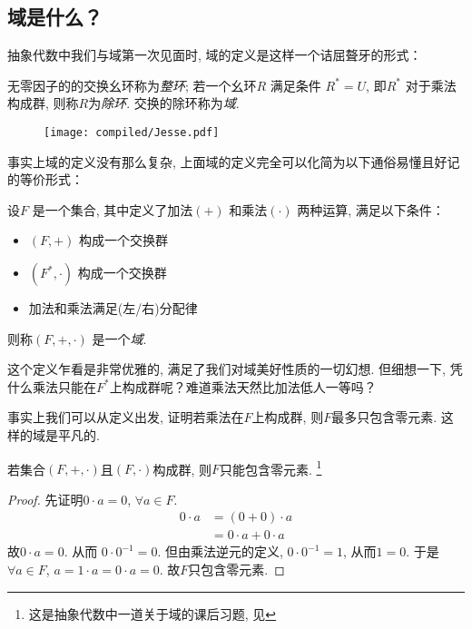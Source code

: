 \subsection{域是什么？}

抽象代数中我们与域第一次见面时, 域的定义是这样一个诘屈聱牙的形式：
\begin{definition}
    无零因子的的交换幺环称为\emph{整环}; 若一个幺环\(R\) 满足条件
    \(R^{*}=U\), 即\(R^{*}\) 对于乘法构成群, 则称\(R\)为\emph{除环}.
    交换的除环称为\emph{域}.
\end{definition}

\begin{figure}[H]
    \centering
    \texttt{[image: compiled/Jesse.pdf]}
\end{figure}
事实上域的定义没有那么复杂, 上面域的定义完全可以化简为以下通俗易懂且好记的等价形式：
\begin{definition}
    设\(F\) 是一个集合, 其中定义了加法\((+)\) 和乘法\((\cdot)\) 两种运算, 满足以下条件：
    \begin{itemize}
        \item \((F, +)\) 构成一个交换群
        \item \((F^{*}, \cdot)\) 构成一个交换群
        \item 加法和乘法满足(左/右)分配律
    \end{itemize}
    则称\((F, +, \cdot)\) 是一个\emph{域}.
\end{definition}

这个定义乍看是非常优雅的, 满足了我们对域美好性质的一切幻想. 但细想一下,
凭什么乘法只能在\(F^{*}\)上构成群呢？难道乘法天然比加法低人一等吗？

事实上我们可以从定义出发, 证明若乘法在\(F\)上构成群, 则\(F\)最多只包含零元素. 这样的域是平凡的.

\begin{theorem}
    若集合\((F, +,
    \cdot)\)且\((F,\cdot)\)构成群, 则\(F\)只能包含零元素.
    \footnote{这是抽象代数中一道关于域的课后习题, 见}
\end{theorem}
\begin{proof}
    先证明\(0 \cdot a=0\), \(\forall a \in F\).
    \begin{align*}
        0 \cdot a &= (0+0) \cdot a\\
        &= 0 \cdot a + 0 \cdot a
    \end{align*}
    故\(0 \cdot a=0\). 从而 \(0\cdot 0^{-1}=0\).
    但由乘法逆元的定义,  \(0 \cdot 0^{-1}=1\), 从而\(1=0\).
    于是\(\forall a \in F\), \(a=1 \cdot a=0 \cdot a=0\).
    故\(F\)只包含零元素.
\end{proof}

